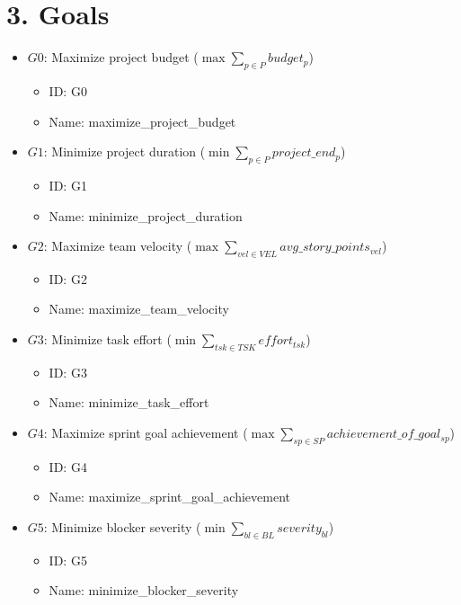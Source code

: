 \documentclass{article}
\begin{document}
\section{3. Goals}
\begin{itemize}
    \item $G0$: Maximize project budget ($\max \sum_{p \in P} budget_p$)
        \begin{itemize}
            \item ID: G0
            \item Name: maximize\_project\_budget
        \end{itemize}
    \item $G1$: Minimize project duration ($\min \sum_{p \in P} project\_end_p$)
        \begin{itemize}
            \item ID: G1
            \item Name: minimize\_project\_duration
        \end{itemize}
    \item $G2$: Maximize team velocity ($\max \sum_{vel \in VEL} avg\_story\_points_{vel}$)
        \begin{itemize}
            \item ID: G2
            \item Name: maximize\_team\_velocity
        \end{itemize}
    \item $G3$: Minimize task effort ($\min \sum_{tsk \in TSK} effort_{tsk}$)
        \begin{itemize}
            \item ID: G3
            \item Name: minimize\_task\_effort
        \end{itemize}
    \item $G4$: Maximize sprint goal achievement ($\max \sum_{sp \in SP} achievement\_of\_goal_{sp}$)
        \begin{itemize}
            \item ID: G4
            \item Name: maximize\_sprint\_goal\_achievement
        \end{itemize}
    \item $G5$: Minimize blocker severity ($\min \sum_{bl \in BL} severity_{bl}$)
        \begin{itemize}
            \item ID: G5
            \item Name: minimize\_blocker\_severity

\end{itemize}
\end{itemize}
\end{document}
